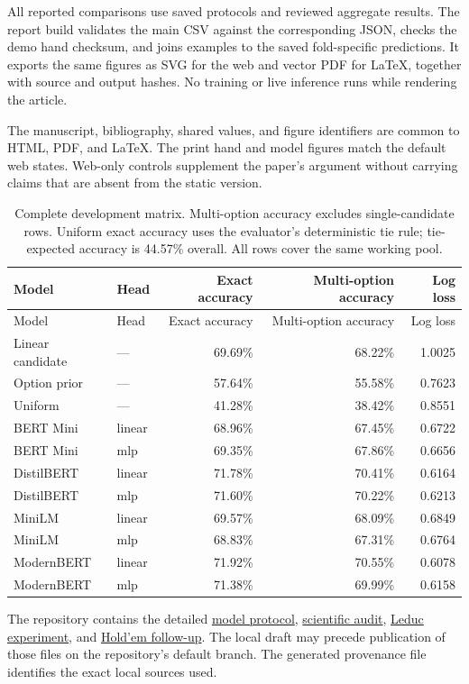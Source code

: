 \documentclass[
  11pt,
  letterpaper,
]{article}
\begin{document}
All reported comparisons use saved protocols and reviewed aggregate
results. The report build validates the main CSV against the
corresponding JSON, checks the demo hand checksum, and joins examples to
the saved fold-specific predictions. It exports the same figures as SVG
for the web and vector PDF for LaTeX, together with source and output
hashes. No training or live inference runs while rendering the article.

The manuscript, bibliography, shared values, and figure identifiers are
common to HTML, PDF, and LaTeX. The print hand and model figures match
the default web states. Web-only controls supplement the paper's
argument without carrying claims that are absent from the static
version.

\begin{longtable}[]{@{}llrrr@{}}
\caption{Complete development matrix. Multi-option accuracy excludes
single-candidate rows. Uniform exact accuracy uses the evaluator's
deterministic tie rule; tie-expected accuracy is 44.57\% overall. All
rows cover the same working pool.}\label{tbl-models}\tabularnewline
\toprule\noalign{}
Model & Head & Exact accuracy & Multi-option accuracy & Log loss \\
\midrule\noalign{}
\endfirsthead
\toprule\noalign{}
Model & Head & Exact accuracy & Multi-option accuracy & Log loss \\
\midrule\noalign{}
\endhead
\bottomrule\noalign{}
\endlastfoot
Linear candidate & --- & 69.69\% & 68.22\% & 1.0025 \\
Option prior & --- & 57.64\% & 55.58\% & 0.7623 \\
Uniform & --- & 41.28\% & 38.42\% & 0.8551 \\
BERT Mini & linear & 68.96\% & 67.45\% & 0.6722 \\
BERT Mini & mlp & 69.35\% & 67.86\% & 0.6656 \\
DistilBERT & linear & 71.78\% & 70.41\% & 0.6164 \\
DistilBERT & mlp & 71.60\% & 70.22\% & 0.6213 \\
MiniLM & linear & 69.57\% & 68.09\% & 0.6849 \\
MiniLM & mlp & 68.83\% & 67.31\% & 0.6764 \\
ModernBERT & linear & 71.92\% & 70.55\% & 0.6078 \\
ModernBERT & mlp & 71.38\% & 69.99\% & 0.6158 \\
\end{longtable}

The repository contains the detailed
\href{https://github.com/nmokey/Poker-Decision-Model/blob/main/docs/week2-results.md}{model
protocol},
\href{https://github.com/nmokey/Poker-Decision-Model/blob/main/docs/scientific-audit.md}{scientific
audit},
\href{https://github.com/nmokey/Poker-Decision-Model/blob/main/docs/meeting4-results.md}{Leduc
experiment}, and
\href{https://github.com/nmokey/Poker-Decision-Model/blob/main/docs/meeting5-scaling.md}{Hold'em
follow-up}. The local draft may precede publication of those files on
the repository's default branch. The generated provenance file
identifies the exact local sources used.
\end{document}
